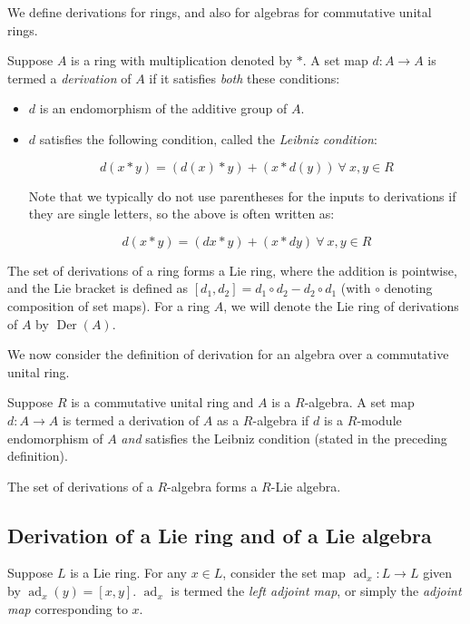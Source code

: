 We define derivations for rings, and also for algebras for commutative
unital rings.

\begin{definer}[Derivation]
  Suppose $A$ is a ring with multiplication denoted by $*$. A set map
  $d:A \to A$ is termed a {\em derivation} of $A$ if it satisfies {\em
    both} these conditions:

  \begin{itemize}
    \item $d$ is an endomorphism of the additive group of $A$.
    \item $d$ satisfies the following condition, called the {\em
      Leibniz condition}:

      $$d(x * y) = (d(x) * y) + (x * d(y)) \ \forall \ x,y \in R$$

      Note that we typically do not use parentheses for the inputs to
      derivations if they are single letters, so the above is often written as:

      $$d(x * y) = (dx * y) + (x * dy) \ \forall \ x,y \in R$$
  \end{itemize}
\end{definer}

The set of derivations of a ring forms a Lie ring, where the addition
is pointwise, and the Lie bracket is defined as $[d_1,d_2] = d_1 \circ
d_2 - d_2 \circ d_1$ (with $\circ$ denoting composition of set
maps). For a ring $A$, we will denote the Lie ring of derivations of
$A$ by $\operatorname{Der}(A)$.

We now consider the definition of derivation for an algebra over a
commutative unital ring.

\begin{definer}
  Suppose $R$ is a commutative unital ring and $A$ is a $R$-algebra. A
  set map $d: A \to A$ is termed a derivation of $A$ as a $R$-algebra
  if $d$ is a $R$-module endomorphism of $A$ {\em and} satisfies the
  Leibniz condition (stated in the preceding definition).
\end{definer}

The set of derivations of a $R$-algebra forms a $R$-Lie algebra.
\subsection{Derivation of a Lie ring and of a Lie algebra}\label{appsec:derivation-lie}

Suppose $L$ is a Lie ring. For any $x \in L$, consider the set map
$\operatorname{ad}_x: L \to L$ given by $\operatorname{ad}_x(y) = [x,y]$. $\operatorname{ad}_x$ is termed the
{\em left adjoint map}, or simply the {\em adjoint map} corresponding
to $x$.

